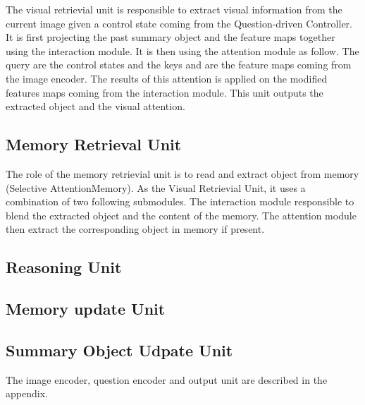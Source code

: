 The visual retrievial unit is responsible to extract visual information from the current image given a control state coming from the Question-driven Controller. It is first projecting the past summary object and the feature maps together using the interaction module.
It is then using the attention module as follow. The query are the control states and the keys and are the feature maps coming from the image encoder. The results of this attention is applied on the modified features maps coming from the interaction module.  
This unit outputs the extracted object and the visual attention.

\subsection{Memory Retrieval Unit}

The role of the memory retrievial unit is to read and extract object from memory (Selective AttentionMemory).
As the Visual Retrievial Unit, it uses a combination of two following submodules. The interaction module responsible to blend the extracted object and the content of the memory. The attention module then extract the corresponding object in memory if present.


\subsection{Reasoning Unit}
\subsection{Memory update Unit}
\subsection{Summary Object Udpate Unit}

The image encoder, question encoder and output unit are described in the appendix.
